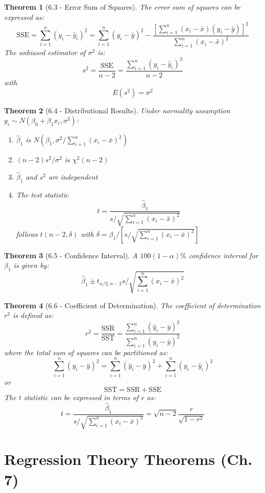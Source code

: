 \documentclass{article}
\newtheorem{theorem}{Theorem}[section]
\begin{document}
\begin{theorem}[6.3 - Error Sum of Squares]
The error sum of squares can be expressed as:
\[\text{SSE} = \sum_{i=1}^n (y_i - \hat{y}_i)^2 = \sum_{i=1}^n (y_i - \bar{y})^2 - \frac{[\sum_{i=1}^n (x_i - \bar{x})(y_i - \bar{y})]^2}{\sum_{i=1}^n (x_i - \bar{x})^2}\]
The unbiased estimator of $\sigma^2$ is:
\[s^2 = \frac{\text{SSE}}{n-2} = \frac{\sum_{i=1}^n (y_i - \hat{y}_i)^2}{n-2}\]
with
\[E(s^2) = \sigma^2\]
\end{theorem}

\begin{theorem}[6.4 - Distributional Results]
Under normality assumption $y_i \sim N(\beta_0 + \beta_1x_i, \sigma^2)$:
\begin{enumerate}
\item $\hat{\beta}_1$ is $N(\beta_1, \sigma^2/\sum_{i=1}^n (x_i - \bar{x})^2)$
\item $(n-2)s^2/\sigma^2$ is $\chi^2(n-2)$
\item $\hat{\beta}_1$ and $s^2$ are independent
\item The test statistic
\[t = \frac{\hat{\beta}_1}{s/\sqrt{\sum_{i=1}^n (x_i - \bar{x})^2}}\]
follows $t(n-2, \delta)$ with $\delta = \beta_1/[s/\sqrt{\sum_{i=1}^n (x_i - \bar{x})^2}]$
\end{enumerate}
\end{theorem}

\begin{theorem}[6.5 - Confidence Interval]
A $100(1-\alpha)\%$ confidence interval for $\beta_1$ is given by:
\[\hat{\beta}_1 \pm t_{\alpha/2, n-2}s/\sqrt{\sum_{i=1}^n (x_i - \bar{x})^2}\]
\end{theorem}

\begin{theorem}[6.6 - Coefficient of Determination]
The coefficient of determination $r^2$ is defined as:
\[r^2 = \frac{\text{SSR}}{\text{SST}} = \frac{\sum_{i=1}^n (\hat{y}_i - \bar{y})^2}{\sum_{i=1}^n (y_i - \bar{y})^2}\]
where the total sum of squares can be partitioned as:
\[\sum_{i=1}^n (y_i - \bar{y})^2 = \sum_{i=1}^n (\hat{y}_i - \bar{y})^2 + \sum_{i=1}^n (y_i - \hat{y}_i)^2\]
or
\[\text{SST} = \text{SSR} + \text{SSE}\]
The $t$ statistic can be expressed in terms of $r$ as:
\[t = \frac{\hat{\beta}_1}{s/\sqrt{\sum_{i=1}^n (x_i - \bar{x})^2}} = \sqrt{n-2}\frac{r}{\sqrt{1-r^2}}\]
\end{theorem}

\section{Regression Theory Theorems (Ch. 7)}
\end{document}
